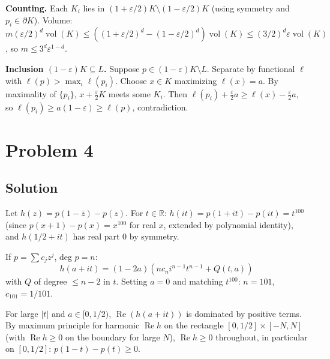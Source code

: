 \documentclass{article}
\begin{document}
\textbf{Counting.} Each $K_i$ lies in $(1 + \varepsilon/2) K \setminus (1 - \varepsilon/2) K$ (using symmetry and $p_i \in \partial K$). Volume: $m (\varepsilon/2)^d \operatorname{vol}(K) \leq ((1+\varepsilon/2)^d - (1-\varepsilon/2)^d) \operatorname{vol}(K) \leq (3/2)^d \varepsilon \operatorname{vol}(K)$, so $m \leq 3^d \varepsilon^{1-d}$.

\textbf{Inclusion $(1-\varepsilon)K \subseteq L$.} Suppose $p \in (1-\varepsilon)K \setminus L$. Separate by functional $\ell$ with $\ell(p) > \max_i \ell(p_i)$. Choose $x \in K$ maximizing $\ell(x) = a$. By maximality of $\{p_i\}$, $x + \tfrac{\varepsilon}{2} K$ meets some $K_i$. Then $\ell(p_i) + \tfrac{\varepsilon}{2} a \geq \ell(x) - \tfrac{\varepsilon}{2} a$, so $\ell(p_i) \geq a(1-\varepsilon) \geq \ell(p)$, contradiction.

\section*{Problem 4}
\subsection*{Solution}
Let $h(z) = p(1 - \bar z) - p(z)$. For $t \in \mathbb{R}$: $h(it) = p(1 + it) - p(it) = t^{100}$ (since $p(x+1) - p(x) = x^{100}$ for real $x$, extended by polynomial identity), and $h(1/2 + it)$ has real part $0$ by symmetry.

If $p = \sum c_j z^j$, deg $p = n$:
\[ h(a + it) = (1 - 2a)(n c_n i^{n-1} t^{n-1} + Q(t, a)) \]
with $Q$ of degree $\leq n-2$ in $t$. Setting $a = 0$ and matching $t^{100}$: $n = 101$, $c_{101} = 1/101$.

For large $|t|$ and $a \in [0, 1/2)$, $\operatorname{Re}(h(a + it))$ is dominated by positive terms. By maximum principle for harmonic $\operatorname{Re} h$ on the rectangle $[0, 1/2] \times [-N, N]$ (with $\operatorname{Re} h \geq 0$ on the boundary for large $N$), $\operatorname{Re} h \geq 0$ throughout, in particular on $[0, 1/2]$: $p(1-t) - p(t) \geq 0$.
\end{document}
